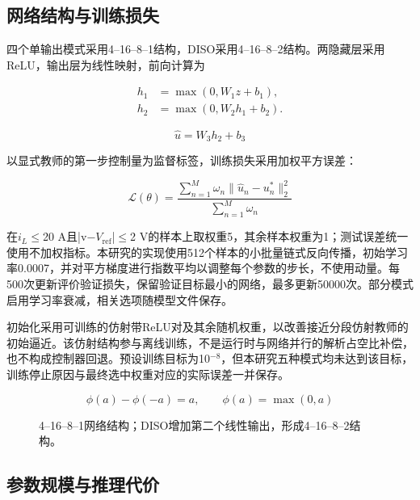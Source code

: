 \documentclass[UTF8,fontset=fandol,a4paper,twocolumn,10pt]{ctexart}
\begin{document}
\subsection{网络结构与训练损失}

四个单输出模式采用4–16–8–1结构，DISO采用4–16–8–2结构。两隐藏层采用ReLU，输出层为线性映射，前向计算为

\begin{equation}\begin{aligned}h_1&=\max(0,W_1z+b_1),\\h_2&=\max(0,W_2h_1+b_2).\end{aligned}\label{eq:26}\end{equation}

\begin{equation}\hat u=W_3h_2+b_3\label{eq:27}\end{equation}

以显式教师的第一步控制量为监督标签，训练损失采用加权平方误差：

\begin{equation}\mathcal L(\theta)=\frac{\sum_{n=1}^{M}\omega_n\|\hat u_n-u_n^*\|_2^2}{\sum_{n=1}^{M}\omega_n}\label{eq:28}\end{equation}

在$i_L$$\le$20 A且|v−$V_{\mathrm{ref}}$|$\le$2 V的样本上取权重5，其余样本权重为1；测试误差统一使用不加权指标。本研究的实现使用512个样本的小批量链式反向传播，初始学习率0.0007，并对平方梯度进行指数平均以调整每个参数的步长，不使用动量。每500次更新评价验证损失，保留验证目标最小的网络，最多更新50000次。部分模式启用学习率衰减，相关选项随模型文件保存。

初始化采用可训练的仿射带ReLU对及其余随机权重，以改善接近分段仿射教师的初始逼近。该仿射结构参与离线训练，不是运行时与网络并行的解析占空比补偿，也不构成控制器回退。预设训练目标为10$^{-8}$，但本研究五种模式均未达到该目标，训练停止原因与最终选中权重对应的实际误差一并保存。

\begin{equation}\phi(a)-\phi(-a)=a,\qquad \phi(a)=\max(0,a)\label{eq:29}\end{equation}

\begin{figure}[!tp]\centering\resizebox{.98\textwidth}{!}{}
\caption{4–16–8–1网络结构；DISO增加第二个线性输出，形成4–16–8–2结构。}\label{fig:6}\end{figure}


\subsection{参数规模与推理代价}
\end{document}
